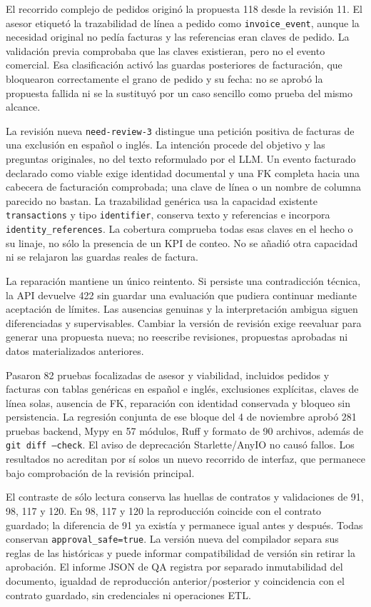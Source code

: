 \documentclass[11pt,letterpaper]{article}
\newcommand{\file}[1]{\texttt{#1}}
\begin{document}
El recorrido complejo de pedidos originó la propuesta 118 desde la revisión
11. El asesor etiquetó la trazabilidad de línea a pedido como
\file{invoice\_event}, aunque la necesidad original no pedía facturas y las
referencias eran claves de pedido. La validación previa comprobaba que las
claves existieran, pero no el evento comercial. Esa clasificación activó las
guardas posteriores de facturación, que bloquearon correctamente el grano
de pedido y su fecha: no se aprobó la propuesta fallida ni se la sustituyó por
un caso sencillo como prueba del mismo alcance.

La revisión nueva \file{need-review-3} distingue una petición positiva de
facturas de una exclusión en español o inglés. La intención procede del
objetivo y las preguntas originales, no del texto reformulado por el LLM.
Un evento facturado declarado como viable exige identidad documental y una FK
completa hacia una cabecera de facturación comprobada; una clave de línea o
un nombre de columna parecido no bastan. La trazabilidad genérica usa la
capacidad existente \file{transactions} y tipo \file{identifier}, conserva
texto y referencias e incorpora \file{identity\_references}. La cobertura
comprueba todas esas claves en el hecho o su linaje, no sólo la presencia de
un KPI de conteo. No se añadió otra capacidad ni se relajaron las guardas
reales de factura.

La reparación mantiene un único reintento. Si persiste una contradicción
técnica, la API devuelve 422 sin guardar una evaluación que pudiera continuar
mediante aceptación de límites. Las ausencias genuinas y la interpretación
ambigua siguen diferenciadas y supervisables. Cambiar la versión de revisión
exige reevaluar para generar una propuesta nueva; no reescribe revisiones,
propuestas aprobadas ni datos materializados anteriores.

Pasaron 82 pruebas focalizadas de asesor y viabilidad, incluidos pedidos y
facturas con tablas genéricas en español e inglés, exclusiones explícitas,
claves de línea solas, ausencia de FK, reparación con identidad conservada y
bloqueo sin persistencia. La regresión conjunta de ese bloque del 4 de noviembre aprobó 281 pruebas
backend, Mypy en 57 módulos, Ruff y formato de 90 archivos, además de
\file{git diff --check}. El aviso de deprecación Starlette/AnyIO no causó
fallos. Los resultados no acreditan por sí solos un nuevo recorrido de
interfaz, que permanece bajo comprobación de la revisión principal.

El contraste de sólo lectura conserva las huellas de contratos y validaciones
de 91, 98, 117 y 120. En 98, 117 y 120 la reproducción coincide con el contrato
guardado; la diferencia de 91 ya existía y permanece igual antes y después.
Todas conservan \file{approval\_safe=true}. La versión nueva del compilador
separa sus reglas de las históricas y puede informar compatibilidad de versión
sin retirar la aprobación. El informe JSON de QA registra por separado
inmutabilidad del documento, igualdad de reproducción anterior/posterior y
coincidencia con el contrato guardado, sin credenciales ni operaciones ETL.
\end{document}
